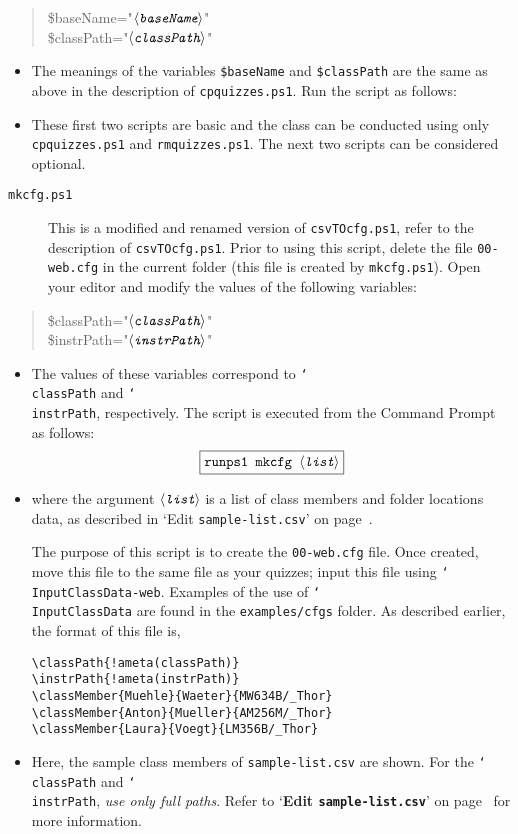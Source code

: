\documentclass{article}
\def\cs#1{\texttt{\char`\\#1}}
\let\uif\textsf
\def\ameta#1{\ensuremath{\langle\textit{\texttt{#1}}\rangle}}
\def\darg#1{\texttt{\char123\relax#1\char125\relax}}
\begin{document}
\begin{quote}\ttfamily
\$baseName="\ameta{baseName}"\\
\$classPath="\ameta{classPath}"
\end{quote}
\begin{itemize}
\item[] The meanings of the variables \texttt{\$baseName} and \texttt{\$classPath} are the same as above in the
description of \texttt{cpquizzes.ps1}. Run the script as follows:
\begin{flushleft}
\end{flushleft}
\item[] These first two scripts are basic and the class can be conducted using only \texttt{cpquizzes.ps1}
and \texttt{rmquizzes.ps1}. The next two scripts can be considered optional.
\end{itemize}
\begin{description}
\item[\normalfont\texttt{mkcfg.ps1}] This is a modified and renamed
    version of \texttt{csvTOcfg.ps1}, refer to the description of \texttt{csvTOcfg.ps1}. Prior to using this
    script, delete the file \texttt{00-web.cfg} in the current
    folder (this file is created by \texttt{mkcfg.ps1}). Open
    your editor and modify the values of the following
    variables:
\end{description}
\begin{quote}\ttfamily
\$classPath="\ameta{classPath}"\\
\$instrPath="\ameta{instrPath}"
\end{quote}
\begin{itemize}
\item[] The values of these variables correspond to \cs{classPath} and
\cs{instrPath}, respectively. The script is executed from the
\uif{Command Prompt} as follows:
\begin{equation*}
    \fbox{\ttfamily runps1 mkcfg \ameta{list}}
\end{equation*}
\item[] where the argument \ameta{list} is a list of class members and
    folder locations data, as described in `Edit \texttt{sample-list.csv}'
    on page~\pageref{item:Editlist}.

The purpose of this script is to create the \texttt{00-web.cfg}
file. Once created, move this file to the same file as your
quizzes; input this file using \cs{InputClassData\darg{00-web}}. Examples of the use
of \cs{InputClassData} are found in the \texttt{examples/cfgs} folder.
As described earlier, the format of this file is,
\begin{Verbatim}[commandchars=!()]
\classPath{!ameta(classPath)}
\instrPath{!ameta(instrPath)}
\classMember{Muehle}{Waeter}{MW634B/_Thor}
\classMember{Anton}{Mueller}{AM256M/_Thor}
\classMember{Laura}{Voegt}{LM356B/_Thor}
\end{Verbatim}
\item[] Here, the sample class members of \texttt{sample-list.csv} are
shown. For the \cs{classPath} and \cs{instrPath}, \emph{use only full
paths}. Refer to `\textbf{Edit \texttt{sample-list.csv}}' on
page~\pageref{item:Editlist} for more information.
\end{itemize}
\end{document}
